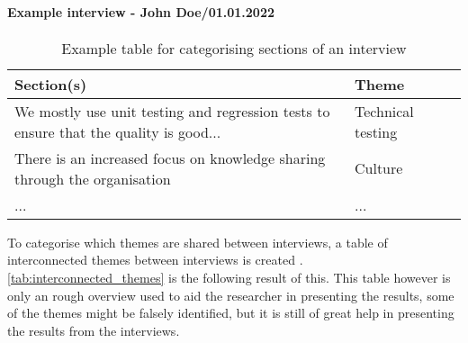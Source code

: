 \paragraph{Example interview - John Doe/01.01.2022} \hspace{0cm}
\begin{table}[H]
\begin{tabular}{|p{0.75\linewidth}|p{0.25\linewidth}|}
\hline
\textbf{Section(s)} & \textbf{Theme} \\ \hline
We mostly use unit testing and regression tests to ensure that the quality is good... & Technical testing \\ \hline
There is an increased focus on knowledge sharing through the organisation & Culture \\ \hline
... & ... \\ \hline
\end{tabular}
\caption{Example table for categorising sections of an interview}
\label{tab:example_interview_categorization}
\end{table}

To categorise which themes are shared between interviews, a table of interconnected themes between interviews is created \cite{bjo_2022}. \autoref{tab:interconnected_themes} is the following result of this. This table however is only an rough overview used to aid the researcher in presenting the results, some of the themes might be falsely identified, but it is still of great help in presenting the results from the interviews.


